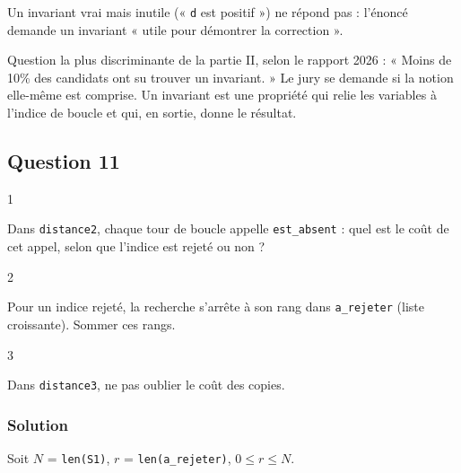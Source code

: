 \documentclass[11pt,a4paper]{article}
\begin{document}
\begin{piege}

Un invariant vrai mais inutile (« \texttt{d} est positif ») ne répond pas : l'énoncé demande un invariant « utile pour démontrer la correction ».

\end{piege}

\begin{jury}

Question la plus discriminante de la partie II, selon le rapport 2026 : « Moins de 10\% des candidats ont su trouver un invariant. » Le jury se demande si la notion elle-même est comprise. Un invariant est une propriété qui relie les variables à l'indice de boucle et qui, en sortie, donne le résultat.

\end{jury}

\hypertarget{question-11}{%
\subsection{Question 11}\label{question-11}}

\begin{indication}{1}

Dans \texttt{distance2}, chaque tour de boucle appelle \texttt{est\_absent} : quel est le coût de cet appel, selon que l'indice est rejeté ou non ?

\end{indication}

\begin{indication}{2}

Pour un indice rejeté, la recherche s'arrête à son rang dans \texttt{a\_rejeter} (liste croissante). Sommer ces rangs.

\end{indication}

\begin{indication}{3}

Dans \texttt{distance3}, ne pas oublier le coût des copies.

\end{indication}

\hypertarget{solution-10}{%
\subsubsection{Solution}\label{solution-10}}

Soit \(N\) = \texttt{len(S1)}, \(r\) = \texttt{len(a\_rejeter)}, \(0 \leqslant r \leqslant N\).
\end{document}

